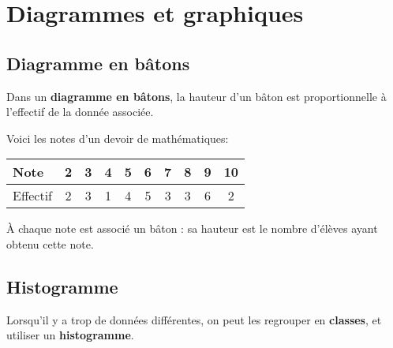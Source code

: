 \documentclass[../€Cours-complet/Cours-complet]{subfiles}
\begin{document}
\section{Diagrammes et graphiques}

\subsection{Diagramme en bâtons}

Dans un \textbf{diagramme en bâtons}, la hauteur d'un bâton est proportionnelle à l'effectif de la donnée associée.

\begin{exemple}
	Voici les notes d'un devoir de mathématiques:

	\begin{center}
		\begin{tabular}{|l|c|c|c|c|c|c|c|c|c|}
			\hline
			Note     & 2 & 3 & 4 & 5 & 6 & 7 & 8 & 9 & 10
			\\ \hline
			Effectif & 2 & 3 & 1 & 4 & 5 & 3 & 3 & 6 & 2
			\\ \hline
		\end{tabular}
	\end{center}

	À chaque note est associé un bâton : sa hauteur est le nombre d'élèves ayant obtenu cette note.

	\begin{center}
	\end{center}
\end{exemple}

\subsection{Histogramme}

Lorsqu'il y a trop de données différentes, on peut les regrouper en \textbf{classes}, et utiliser un \textbf{histogramme}.
\end{document}
